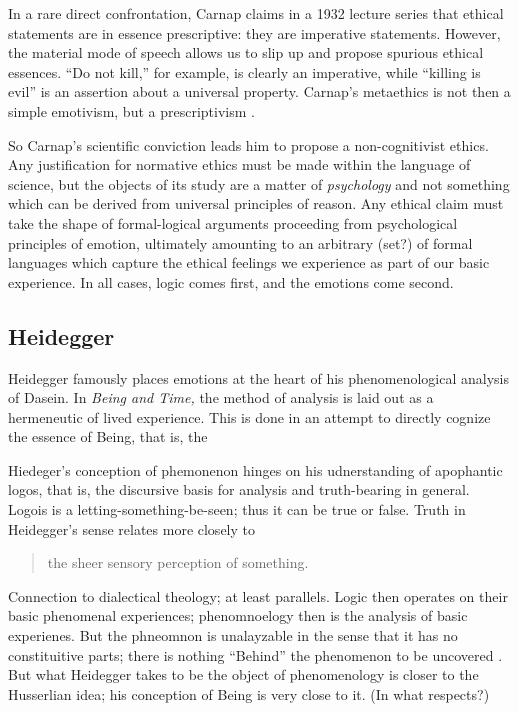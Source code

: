 \documentclass[leqno, 12pt]{turabian-researchpaper}
\begin{document}
	In a rare direct confrontation, Carnap claims in a 1932 lecture series that ethical
	statements are in essence prescriptive: they are imperative statements. However,
	the material mode of speech allows us to slip up and propose spurious ethical
	essences. \enquote{Do not kill,} for example, is clearly an imperative, while
	\enquote{killing is evil} is an assertion about a universal property. Carnap's
	metaethics is not then a simple emotivism, but a prescriptivism \autocite[1.4]{carnap1996}.

	So Carnap's scientific conviction leads him to propose a non-cognitivist ethics.
	Any justification for normative ethics must be made within the language of
	science, but the objects of its study are a matter of \emph{psychology} and
	not something which can be derived from universal principles of reason. Any ethical
	claim must take the shape of formal-logical arguments proceeding from psychological
	principles of emotion, ultimately amounting to an arbitrary (set?) of formal languages
	which capture the ethical feelings we experience as part of our basic experience.
	In all cases, logic comes first, and the emotions come second.

	\subsection{Heidegger}

	Heidegger famously places emotions at the heart of his phenomenological analysis
	of Dasein. In \textit{Being and Time,} the method of analysis is laid out as a
	hermeneutic of lived experience. This is done in an attempt to directly
	cognize the essence of Being, that is, the



	Hiedeger's conception of phemonenon hinges on his udnerstanding of apophantic logos,
	that is, the discursive basis for analysis and truth-bearing in general.
	Logois is a letting-something-be-seen; thus it can be true or false. Truth in
	Heidegger's sense relates more closely to \blockquote[{\cite[p57]{heidegger2008b}}]{the sheer sensory perception of something.}
	Connection to dialectical theology; at least parallels. Logic then operates on
	their basic phenomenal experiences; phenomnoelogy then is the analysis of basic
	experienes. But the phneomnon is unalayzable in the sense that it has no
	constituitive parts; there is nothing \enquote{Behind} the phenomenon to be
	uncovered \autocite[p60]{heidegger2008b}. But what Heidegger takes to be the object
	of phenomenology is closer to the Husserlian idea; his conception of Being is
	very close to it. (In what respects?)
\end{document}
